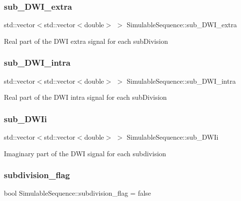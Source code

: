 \subsubsection{\texorpdfstring{sub\+\_\+\+D\+W\+I\+\_\+extra}{sub\_DWI\_extra}}
{\footnotesize\ttfamily std\+::vector$<$std\+::vector$<$double$>$ $>$ Simulable\+Sequence\+::sub\+\_\+\+D\+W\+I\+\_\+extra}

Real part of the D\+WI extra signal for each sub\+Division \mbox{\label{class_simulable_sequence_a20a947108c3bb80ed45dd8851e777511}} 
\subsubsection{\texorpdfstring{sub\+\_\+\+D\+W\+I\+\_\+intra}{sub\_DWI\_intra}}
{\footnotesize\ttfamily std\+::vector$<$std\+::vector$<$double$>$ $>$ Simulable\+Sequence\+::sub\+\_\+\+D\+W\+I\+\_\+intra}

Real part of the D\+WI intra signal for each sub\+Division \mbox{\label{class_simulable_sequence_a1e958cc7d15337fa3ae0e58c8330f212}} 
\subsubsection{\texorpdfstring{sub\+\_\+\+D\+W\+Ii}{sub\_DWIi}}
{\footnotesize\ttfamily std\+::vector$<$std\+::vector$<$double$>$ $>$ Simulable\+Sequence\+::sub\+\_\+\+D\+W\+Ii}

Imaginary part of the D\+WI signal for each subdivision \mbox{\label{class_simulable_sequence_ae9e6e581ba16bbf81b693c0e4943bbf9}} 
\subsubsection{\texorpdfstring{subdivision\+\_\+flag}{subdivision\_flag}}
{\footnotesize\ttfamily bool Simulable\+Sequence\+::subdivision\+\_\+flag = false}

